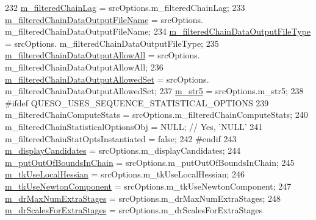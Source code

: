 \begin{DoxyCode}
232   \hyperlink{class_q_u_e_s_o_1_1_m_l_sampling_level_options_a6740efa52d4f8ec112be817f5220cf94}{m\_filteredChainLag}                          = srcOptions.m\_filteredChainLag;
233   \hyperlink{class_q_u_e_s_o_1_1_m_l_sampling_level_options_abf333c405ee097104ee9b1b1e92ecd97}{m\_filteredChainDataOutputFileName}           = srcOptions.
      m\_filteredChainDataOutputFileName;
234   \hyperlink{class_q_u_e_s_o_1_1_m_l_sampling_level_options_a154ba7fd5c2fbc98af0ac91bb022a232}{m\_filteredChainDataOutputFileType}           = srcOptions.
      m\_filteredChainDataOutputFileType;
235   \hyperlink{class_q_u_e_s_o_1_1_m_l_sampling_level_options_a80471ba2c70d39f2cb7e1ea954fb86b8}{m\_filteredChainDataOutputAllowAll}           = srcOptions.
      m\_filteredChainDataOutputAllowAll;
236   \hyperlink{class_q_u_e_s_o_1_1_m_l_sampling_level_options_a12bf1b2424e791608d3dcd1254c3eef2}{m\_filteredChainDataOutputAllowedSet}         = srcOptions.
      m\_filteredChainDataOutputAllowedSet;
237   \hyperlink{class_q_u_e_s_o_1_1_m_l_sampling_level_options_a341ed1186366d5483559298a8c5348d2}{m\_str5}                                      = srcOptions.m\_str5;
238 \textcolor{preprocessor}{#ifdef QUESO\_USES\_SEQUENCE\_STATISTICAL\_OPTIONS}
239 \textcolor{preprocessor}{}  m\_filteredChainComputeStats                 = srcOptions.m\_filteredChainComputeStats;
240   m\_filteredChainStatisticalOptionsObj        = NULL; \textcolor{comment}{// Yes, 'NULL'}
241   m\_filteredChainStatOptsInstantiated         = \textcolor{keyword}{false};
242 \textcolor{preprocessor}{#endif}
243 \textcolor{preprocessor}{}  \hyperlink{class_q_u_e_s_o_1_1_m_l_sampling_level_options_a975a24a45096ac07b8e3a6cade590bbc}{m\_displayCandidates}                         = srcOptions.m\_displayCandidates;
244   \hyperlink{class_q_u_e_s_o_1_1_m_l_sampling_level_options_acf244c6ea5d1ac9c61d19d1d8f24fd8c}{m\_putOutOfBoundsInChain}                     = srcOptions.m\_putOutOfBoundsInChain;
245   \hyperlink{class_q_u_e_s_o_1_1_m_l_sampling_level_options_a981084edf651ff9db5dd56a36ef54a61}{m\_tkUseLocalHessian}                         = srcOptions.m\_tkUseLocalHessian;
246   \hyperlink{class_q_u_e_s_o_1_1_m_l_sampling_level_options_aa763d458ffbb83ea5be881e9535a2cb5}{m\_tkUseNewtonComponent}                      = srcOptions.m\_tkUseNewtonComponent;
247   \hyperlink{class_q_u_e_s_o_1_1_m_l_sampling_level_options_ab854494640bb98cad74ee656e62daab3}{m\_drMaxNumExtraStages}                       = srcOptions.m\_drMaxNumExtraStages;
248   \hyperlink{class_q_u_e_s_o_1_1_m_l_sampling_level_options_ab4bdcc9166bc8cdbc9f5915dcb77e34a}{m\_drScalesForExtraStages}                    = srcOptions.m\_drScalesForExtraStages

\end{DoxyCode}

